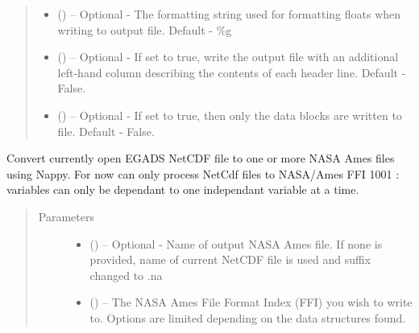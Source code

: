 \documentclass[a4paper,10pt,openany,english]{sphinxmanual}
\begin{document}
\begin{fulllineitems}
\begin{fulllineitems}
\begin{quote}
\begin{description}
\begin{itemize}
\item {} 
 () -- Optional - The formatting string used for formatting floats when writing
to output file. Default - \%g

\item {} 
 () -- Optional - If set to true, write the output file with an additional left-hand
column describing the contents of each header line. Default - False.

\item {} 
 () -- Optional - If set to true, then only the data blocks are written to file.
Default - False.

\end{itemize}

\end{description}\end{quote}

\end{fulllineitems}


\begin{fulllineitems}
\label{egadsapi:egads.input.netcdf_io.EgadsNetCdf.convert_to_nasa_ames}
Convert currently open EGADS NetCDF file to one or more NASA Ames files
using  Nappy. For now can only process NetCdf files to NASA/Ames FFI 1001 : 
variables can only be dependant to one independant variable at a time.
\begin{quote}\begin{description}
\item[{Parameters}] \leavevmode\begin{itemize}
\item {} 
 () -- Optional - Name of output NASA Ames file. If none is provided, name of
current NetCDF file is used and suffix changed to .na

\item {} 
 () -- The NASA Ames File Format Index (FFI) you wish to write to. Options
are limited depending on the data structures found.


\end{itemize}
\end{description}
\end{quote}
\end{fulllineitems}
\end{fulllineitems}
\end{document}
